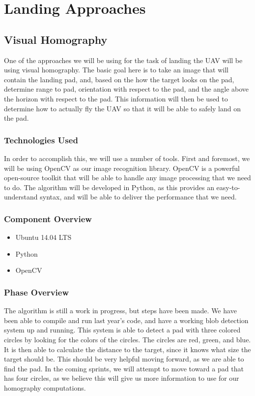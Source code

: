\newpage
\section{Landing Approaches}
\subsection{Visual Homography}
One of the approaches we will be using for the task of landing the UAV will be using visual homography. The basic goal here is to take an image that will contain the landing pad, and, based on the how the target looks on the pad, determine range to pad, orientation with respect to the pad, and the angle above the horizon with respect to the pad. This information will then be used to determine how to actually fly the UAV so that it will be able to safely land on the pad.
\subsubsection{Technologies  Used}
In order to accomplish this, we will use a number of tools. First and foremost, we will be using OpenCV as our image recognition library. OpenCV is a powerful open-source toolkit that will be able to handle any image processing that we need to do. The algorithm will be developed in Python, as this provides an easy-to-understand syntax, and will be able to deliver the performance that we need.
\subsubsection{Component  Overview}
\begin{itemize}
	\item Ubuntu 14.04 LTS
	\item Python
	\item OpenCV
\end{itemize}
\subsubsection{Phase Overview}
The algorithm is still a work in progress, but steps have been made. We have been able to compile and run last year's code, and have a working blob detection system up and running. This system is able to detect a pad with three colored circles by looking for the colors of the circles. The circles are red, green, and blue. It is then able to calculate the distance to the target, since it knows what size the target should be. This should be very helpful moving forward, as we are able to find the pad. In the coming sprints, we will attempt to move toward a pad that has four circles, as we believe this will give us more information to use for our homography computations.
